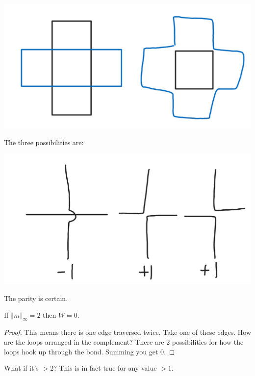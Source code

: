 \documentclass[12pt]{book}
\theoremstyle{norm}
\begin{document}
\begin{center}\includegraphics[scale=.25]{images/12-2}\end{center}

The three possibilities are:

\begin{center}\includegraphics[scale=.25]{images/12-3}\end{center}

The parity is certain. 

\begin{lemma}
If $\left\Vert {m}\right\Vert_{\infty}=2$ then $W=0$.
\end{lemma}
\begin{proof}
This means there is one edge traversed twice. Take one of these edges. How are the loops arranged in the complement? There are 2 possibilities for how the loops hook up through the bond. Summing you get 0.
\end{proof}
What if it's $>2$? This is in fact true for any value $>1$.
\end{document}
